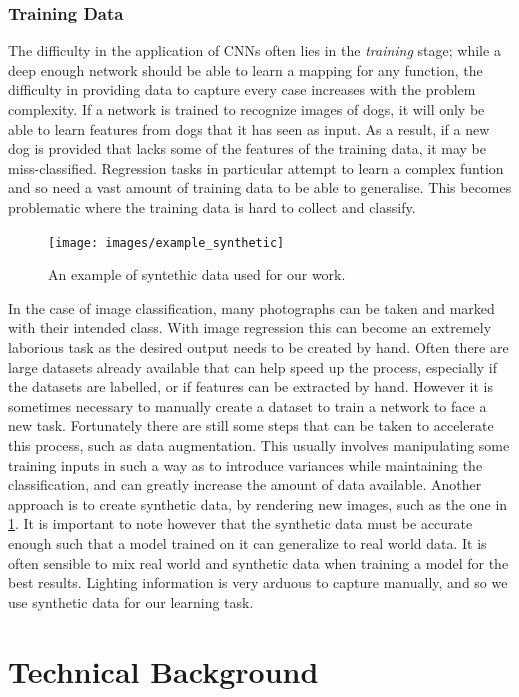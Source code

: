 \documentclass[ %
                    author={Gavin Parker},
                supervisor={Dr. Neill Campbell},
                    degree={MEng},
                     title={Deep Siamese Networks for Illumination Estimation from Stereo Images},
                  subtitle={},
                      type={Research},
                      year={2018} ]{dissertation}
\begin{document}
\subsection{Training Data}
The difficulty in the application of CNNs often lies in the \textit{training} stage; while a deep enough network should be able to learn a mapping for any function, the difficulty in providing data to capture every case increases with the problem complexity. If a network is trained to recognize images of dogs, it will only be able to learn features from dogs that it has seen as input. As a result, if a new dog is provided that lacks some of the features of the training data, it may be miss-classified. Regression tasks in particular attempt to learn a complex funtion and so need a vast amount of training data to be able to generalise. This becomes problematic where the training data is hard to collect and classify.
\begin{figure}
\texttt{[image: images/example\_synthetic]}
\centering
\caption{An example of syntethic data used for our work.}
\label{fig:synth}
\end{figure}
In the case of image classification, many photographs can be taken and marked with their intended class. With image regression this can become an extremely laborious task as the desired output needs to be created by hand. Often there are large datasets already available that can help speed up the process, especially if the datasets are labelled, or if features can be extracted by hand. However it is sometimes necessary to manually create a dataset to train a network to face a new task. Fortunately there are still some steps that can be taken to accelerate this process, such as data augmentation. This usually involves manipulating some training inputs in such a way as to introduce variances while maintaining the classification, and can greatly increase the amount of data available.
Another approach is to create synthetic data, by rendering new images, such as the one in \ref{fig:synth}. It is important to note however that the synthetic data must be accurate enough such that a model trained on it can generalize to real world data. It is often sensible to mix real world and synthetic data when training a model for the best results. Lighting information is very arduous to capture manually, and so we use synthetic data for our learning task.


\chapter{Technical Background}
\label{chap:technical}
\end{document}
